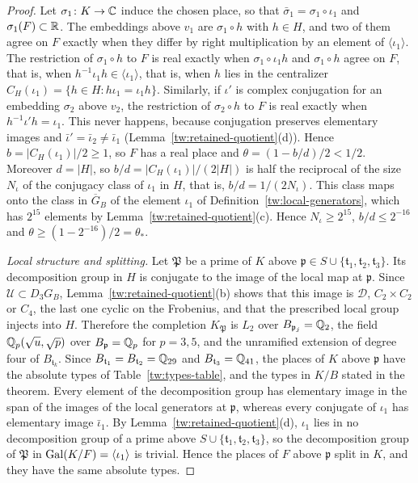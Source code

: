 \begin{proof}
Let $\sigma_1\colon K\to\mathbb C$
induce the chosen place, so that $\bar\sigma_1=\sigma_1\circ\iota_1$ and
$\sigma_1(F)\subset\mathbb R$. The embeddings above $v_1$ are $\sigma_1\circ h$ with
$h\in H$, and two of them agree on $F$ exactly when they differ by right
multiplication by an element of $\langle\iota_1\rangle$. The restriction of
$\sigma_1\circ h$ to $F$ is real exactly when $\sigma_1\circ\iota_1h$ and
$\sigma_1\circ h$ agree on $F$, that is, when
$h^{-1}\iota_1h\in\langle\iota_1\rangle$, that is, when $h$ lies in the
centralizer $C_H(\iota_1)=\{h\in H:h\iota_1=\iota_1h\}$. Similarly, if $\iota'$ is complex conjugation for an
embedding $\sigma_2$ above $v_2$, the restriction of $\sigma_2\circ h$ to $F$
is real exactly when $h^{-1}\iota'h=\iota_1$. This never happens, because
conjugation preserves elementary images and $\bar\iota'=\bar\iota_2\ne\bar\iota_1$
(Lemma~\ref{tw:retained-quotient}(d)). Hence $b=|C_H(\iota_1)|/2\ge1$, so $F$
has a real place and $\theta=(1-b/d)/2<1/2$. Moreover $d=|H|$, so
$b/d=|C_H(\iota_1)|/(2|H|)$ is half the reciprocal of the size $N_\iota$ of
the conjugacy class of $\iota_1$ in $H$, that is, $b/d=1/(2N_\iota)$. This
class maps onto the class in $\overline G_B$ of the element $\iota_1$ of
Definition~\ref{tw:local-generators}, which has $2^{15}$
elements by Lemma~\ref{tw:retained-quotient}(c). Hence $N_\iota\ge2^{15}$,
$b/d\le2^{-16}$ and $\theta\ge(1-2^{-16})/2=\theta_*$.

\emph{Local structure and splitting.} Let $\mathfrak P$ be a prime of $K$
above $\mathfrak p\in S\cup\{\mathfrak t_1,\mathfrak t_2,\mathfrak t_3\}$. Its
decomposition group in $H$ is conjugate to the image of the local map at
$\mathfrak p$. Since $\mathcal U\subset D_3G_B$, Lemma~\ref{tw:retained-quotient}(b)
shows that this image is $\mathcal D$, $C_2\times C_2$ or $C_4$, the last one cyclic on
the Frobenius, and that the prescribed local group injects into $H$.
Therefore the completion $K_{\mathfrak P}$ is $L_2$ over
$B_{\mathfrak p_j}=\mathbb Q_2$, the field $\mathbb Q_p(\sqrt u,\sqrt p)$ over
$B_{\mathfrak p}=\mathbb Q_p$ for $p=3,5$, and the unramified extension of degree
four of $B_{\mathfrak t_k}$. Since $B_{\mathfrak t_1}=B_{\mathfrak t_2}=\mathbb Q_{29}$
and $B_{\mathfrak t_3}=\mathbb Q_{41}$, the places of $K$ above $\mathfrak p$ have the
absolute types of Table~\ref{tw:types-table}, and the types in $K/B$ stated in
the theorem. Every element of
the decomposition group has elementary image in the span of the images of the
local generators at $\mathfrak p$, whereas every conjugate of $\iota_1$ has
elementary image $\bar\iota_1$. By Lemma~\ref{tw:retained-quotient}(d),
$\iota_1$ lies in no decomposition group of a prime above
$S\cup\{\mathfrak t_1,\mathfrak t_2,\mathfrak t_3\}$, so the decomposition
group of $\mathfrak P$ in $\operatorname{Gal}(K/F)=\langle\iota_1\rangle$ is trivial. Hence
the places of $F$ above $\mathfrak p$ split in $K$, and they have the same
absolute types.


\end{proof}
